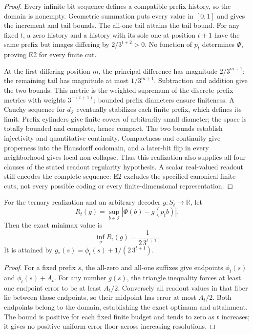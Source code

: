 \begin{proof}
Every infinite bit sequence defines a compatible prefix history, so the domain is nonempty. Geometric summation puts every value in $[0,1]$ and gives the increment and tail bounds. The all-one tail attains the tail bound. For any fixed $t$, a zero history and a history with its sole one at position $t+1$ have the same prefix but images differing by $2/3^{t+2}>0$. No function of $p_t$ determines $\Phi$, proving E2 for every finite cut.

At the first differing position $m$, the principal difference has magnitude $2/3^{m+1}$; the remaining tail has magnitude at most $1/3^{m+1}$. Subtraction and addition give the two bounds. This metric is the weighted supremum of the discrete prefix metrics with weights $3^{-(t+1)}$; bounded prefix diameters ensure finiteness. A Cauchy sequence for $d_{\mathcal I}$ eventually stabilizes each finite prefix, which defines its limit. Prefix cylinders give finite covers of arbitrarily small diameter; the space is totally bounded and complete, hence compact. The two bounds establish injectivity and quantitative continuity. Compactness and continuity give properness into the Hausdorff codomain, and a later-bit flip in every neighborhood gives local non-collapse. Thus this realization also supplies all four clauses of the stated readout regularity hypothesis. A scalar real-valued readout still encodes the complete sequence: E2 excludes the specified canonical finite cuts, not every possible coding or every finite-dimensional representation.
\end{proof}

\begin{theorem}\label{thm:finite-cut-minimax}
For the ternary realization and an arbitrary decoder $g:S_t\to\mathbb R$, let
\[
R_t(g)=\sup_{b\in\mathcal I}|\Phi(b)-g(p_tb)|.
\]
Then the exact minimax value is
\[
\inf_g R_t(g)=\frac{1}{2\,3^{t+1}}.
\]
It is attained by $g_\ast(s)=\phi_t(s)+1/(2\,3^{t+1})$.
\end{theorem}

\begin{proof}
For a fixed prefix $s$, the all-zero and all-one suffixes give endpoints $\phi_t(s)$ and $\phi_t(s)+A_t$. For any number $g(s)$, the triangle inequality forces at least one endpoint error to be at least $A_t/2$. Conversely all readout values in that fiber lie between those endpoints, so their midpoint has error at most $A_t/2$. Both endpoints belong to the domain, establishing the exact optimum and attainment. The bound is positive for each fixed finite budget and tends to zero as $t$ increases; it gives no positive uniform error floor across increasing resolutions.
\end{proof}

